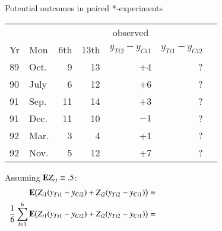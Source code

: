 \begin{frame}{Potential outcomes in paired *-experiments}
  
\begin{tabular}{ll|rrrrr} \hline
 &  & \multicolumn{4}{c}{observed} \\
Yr & Mon &   6th &	13th&$y_{Ti2} -y_{Ci1}$ &$y_{Ti1} -y_{Ci2}$\\ \hline
89 & Oct. &	9 &	13  & +4 & ? \\
90 & July &	6 &	12  & +6 & ? \\
91 & Sep. &   11  &	14   & +3 & ?\\
91 & Dec. &   11 &	10  & $-1$& ? \\
92 & Mar. &	3 &	4    & +1& ?\\
92 & Nov. &	5 &	12  & +7& ? \\ \hline
\end{tabular}
\medskip

Assuming $\mathbf{E} Z_{ij} \equiv .5 $:\\
\begin{align*}
\EE \big( Z_{i1}(y_{Ti1} -y_{Ci2}) + Z_{i2}(y_{Ti2} - y_{Ci1} )
  \big) &=\hspace{.5\linewidth}  \\
\frac{1}{6} \sum_{i=1}^6 \EE \big( Z_{i1}(y_{Ti1} -y_{Ci2}) + Z_{i2}(y_{Ti2} - y_{Ci1} ) \big)  &= \\  
\end{align*}
\end{frame}


